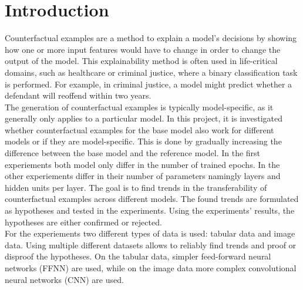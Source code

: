 \documentclass{article}
\begin{document}
\section{Introduction}
Counterfactual examples are a method to explain a model's decisions by showing how one or more input features would have to change in order to change the output of the model. This explainability method is often used in life-critical domains, such as healthcare or criminal justice, where a binary classification task is performed. For example, in criminal justice, a model might predict whether a defendant will reoffend within two years. \\
The generation of counterfactual examples is typically model-specific, as it generally only applies to a particular model. In this project, it is investigated whether counterfactual examples for the base model also work for different models or if they are model-specific. This is done by gradually increasing the difference between the base model and the reference model. In the first experiements both model only differ in the number of trained epochs. In the other experiements differ in their number of parameters namingly layers and hidden units per layer. The goal is to find trends in the transferability of counterfactual examples across different models. The found trends are formulated as hypotheses and tested in the experiments. Using the experiments' results, the hypotheses are either confirmed or rejected. \\
For the experiements two different types of data is used: tabular data and image data. Using multiple different datasets allows to reliably find trends and proof or disproof the hypotheses. On the tabular data, simpler feed-forward neural networks (FFNN) are used, while on the image data more complex convolutional neural networks (CNN) are used. \\
\end{document}
